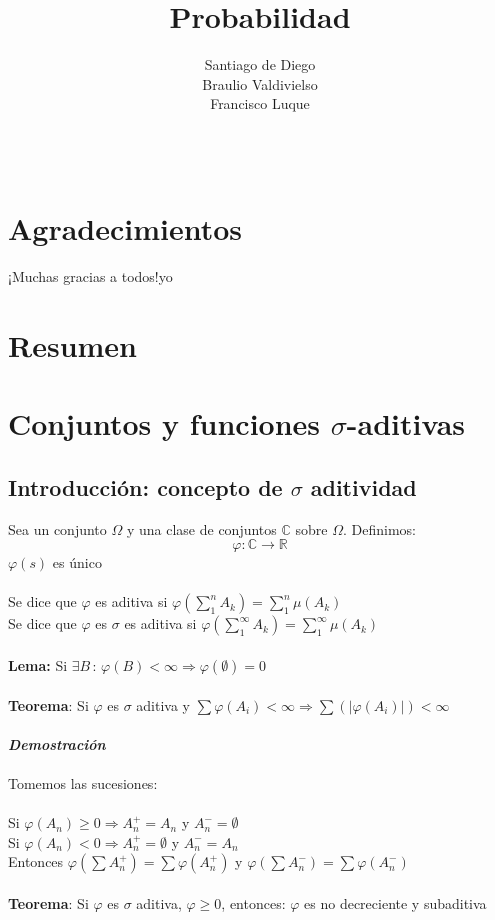 \documentclass[12pt,a4paper,openright]{book}
\author{Santiago de Diego\\Braulio Valdivielso\\Francisco Luque}
\title{Probabilidad}
\date{}
\begin{document}
\maketitle
\newpage
$\ $
\chapter*{Agradecimientos} %
 
¡Muchas gracias a todos!yo

\chapter*{Resumen} %

\tableofcontents
\chapter{Conjuntos y funciones $\sigma$-aditivas}
\section{Introducción: concepto de $\sigma$ aditividad}
Sea un conjunto $\Omega$ y una clase de conjuntos $\mathbb{C}$ sobre $\Omega$. Definimos:
$$\varphi : \mathbb{C}\rightarrow \mathbb{R}$$
$\varphi (s)$ es único\\\\
Se dice que $\varphi$ es aditiva si $\varphi(\displaystyle\sum_{1}^{n}A_k)=\displaystyle\sum_1^n\mu(A_k)$\\
Se dice que $\varphi$ es $\sigma$ es aditiva si $\varphi(\displaystyle\sum_1^\infty A_k)=\displaystyle\sum_1^\infty \mu(A_k)$\\\\
\textbf{Lema:} Si $\exists B\, : \, \varphi(B)<\infty \Rightarrow \varphi(\emptyset)=0$
\\\\
\textbf{Teorema}: Si $\varphi$ es $\sigma$ aditiva y $\displaystyle\sum\varphi(A_i)<\infty\Rightarrow\displaystyle\sum(\vert \varphi(A_i)\vert)<\infty$\\\\
\textit{\textbf{Demostración}}\\\\
Tomemos las sucesiones: \\\\
Si $\varphi(A_n)\geq 0 \Longrightarrow A_n^{+}=A_n$ y $A_n^{-}=\emptyset$\\
Si $\varphi(A_n)<0 \Longrightarrow A_n^{+}=\emptyset$ y $A_n^{-}=A_n$\\
Entonces $\varphi(\displaystyle\sum A_n^{+})=\displaystyle\sum\varphi(A_n^{+})$ y $\varphi(\displaystyle\sum A_n^{-})=\displaystyle\sum\varphi(A_n^{-})$\\\\
\textbf{Teorema}: Si $\varphi$ es $\sigma$ aditiva, $\varphi\geq 0$, entonces: $\varphi$ es no decreciente y subaditiva
\end{document}
